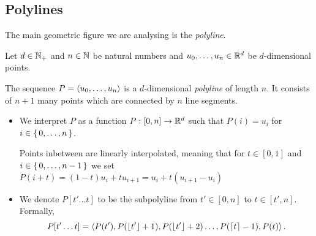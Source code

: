 \subsection{Polylines}
\label{ssec:polylines}
The main geometric figure we are analysing is the \emph{polyline}.
\begin{definition}[Polyline]
  Let \(d\in \mathbb{N}_+\) and \(n \in \mathbb{N}\) be natural numbers and \(u_0, \dots, u_n \in \mathbb{R}^d\) be \(d\)-dimensional points. 

  The sequence \(P = \left\langle u_0, \dots, u_n\right\rangle\) is a \(d\)-dimensional \emph{polyline} of length \(n\). It consists of \(n+1\) many points which are connected by \(n\) line segments. 

  \begin{itemize}
    \item We interpret \(P\) as a function \(P:[0,n] \to \mathbb{R}^d\) such that \(P(i) = u_i\) for \(i \in \set{0, \dots, n}\).

      Points inbetween are linearly interpolated, meaning that for \(t \in [0, 1]\) and \(i \in \set{0, \dots, n - 1}\) we set \(P(i + t) = (1- t)u_i + t u_{i+1} = u_i + t(u_{i+1} - u_i)\)
    \item We denote \(P[t'\dots t]\) to be the subpolyline from \(t' \in [0, n]\) to \(t \in [t', n]\). Formally, \[P[t'\dots t] = \left\langle P(t'), P(\left\lfloor t'\right\rfloor + 1),  P(\left\lfloor t'\right\rfloor + 2) \dots, P(\left\lceil t\right\rceil - 1), P(t)\right\rangle.\]
  \end{itemize}

\end{definition}

